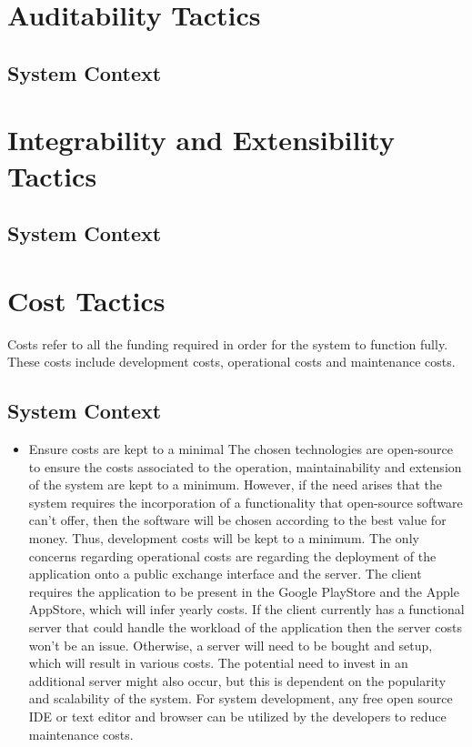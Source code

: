 \documentclass[11pt,fleqn]{book} %
\begin{document}
\section{Auditability Tactics}
	\subsection{System Context}
\section{Integrability and Extensibility Tactics}
	\subsection{System Context}
\section{Cost Tactics}
	Costs refer to all the funding required in order for the system to function fully. These costs include development costs, operational costs and maintenance costs.
	\subsection{System Context}
		\begin{itemize}
			\item Ensure costs are kept to a minimal \newline\newline
			The chosen technologies are open-source to ensure the costs associated to the operation, maintainability and extension of the system are kept to a minimum. However, if the need arises that the system requires the incorporation of a functionality that open-source software can’t offer, then the software will be chosen according to the best value for money. Thus, development costs will be kept to a minimum. The only concerns regarding operational costs are regarding the deployment of the application onto a public exchange interface and the server. The client requires the application to be present in the Google PlayStore and the Apple AppStore, which will infer yearly costs. If the client currently has a functional server that could handle the workload of the application then the server costs won’t be an issue. Otherwise, a server will need to be bought and setup, which will result in various costs. The potential need to invest in an additional server might also occur, but this is dependent on the popularity and scalability of the system. For system development, any free open source IDE or text editor and browser can be utilized by the developers to reduce maintenance costs.
			
		\end{itemize}
\end{document}
